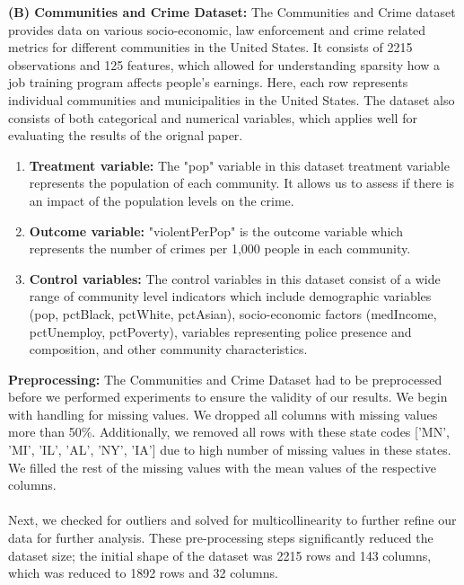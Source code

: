 \textbf{(B) Communities and Crime Dataset:} The Communities and Crime dataset provides data on various socio-economic, law enforcement and crime related metrics for different communities in the United States. It consists of 2215 observations and 125 features, which allowed for understanding sparsity how a job training program affects people's earnings. Here, each row represents individual communities and municipalities in the United States. The dataset also consists of both categorical and numerical variables, which applies well for evaluating the results of the orignal paper. 
\begin{enumerate}
    \item \textbf{Treatment variable:} The "pop" variable in this dataset treatment variable represents the population of each community. It allows us to assess if there is an impact of the population levels on the crime. 
    \item \textbf{Outcome variable:} "violentPerPop" is the outcome variable which represents the number of crimes per 1,000 people in each community.
    \item \textbf{Control variables:} The control variables in this dataset consist of a wide range of community level indicators which include demographic variables (pop, pctBlack, pctWhite, pctAsian), socio-economic factors (medIncome, pctUnemploy, pctPoverty), variables representing police presence and composition, and other community characteristics.
\end{enumerate}

\textbf{Preprocessing:} The Communities and Crime Dataset had to be preprocessed before we performed experiments to ensure the validity of our results. We begin with handling for missing values. We dropped all columns with missing values more than 50\%. Additionally, we removed all rows with these state codes ['MN', 'MI', 'IL', 'AL', 'NY', 'IA'] due to high number of missing values in these states. We filled the rest of the missing values with the mean values of the respective columns. \\
\\
Next, we checked for outliers and solved for multicollinearity to further refine our data for further analysis. These pre-processing steps significantly reduced the dataset size; the initial shape of the dataset was 2215 rows and 143 columns, which was reduced to 1892 rows and 32 columns.